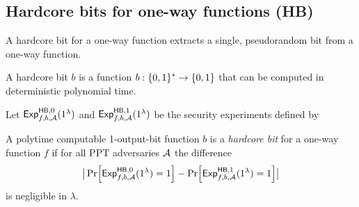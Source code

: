 \subsection{Hardcore bits for one-way functions (HB)}
A hardcore bit for a one-way function extracts a single, pseudorandom bit from a one-way function.

\begin{definition}[HB syntax]
A hardcore bit $b$ is a function $b:\{0,1\}^*\rightarrow\{0,1\}$ that can be computed in deterministic polynomial time.
\end{definition}

\begin{definition}
Let ${\mathsf{Exp}}_{f,b,\mathcal{A}}^{\mathsf{HB},0}(1^\lambda)$ and ${\mathsf{Exp}}_{f,b,\mathcal{A}}^{\mathsf{HB},1}(1^\lambda)$ be the security experiments defined by
\begin{center}
  \begin{pchstack}
  \pchspace
  \end{pchstack}
  \end{center}
A polytime computable 1-output-bit function $b$ is a \emph{hardcore bit} for 
a one-way function $f$ if for all PPT adversaries $\mathcal{A}$ the difference
\[ \big|\prob{{\mathsf{Exp}}_{f,b,\adv}^{\mathsf{HB},0}(1^\lambda) = 1} 
   - \prob{{\mathsf{Exp}}_{f,b,\adv}^{\mathsf{HB},1}(1^\lambda) = 1}\big| \]
is negligible in $\lambda$.
\end{definition}